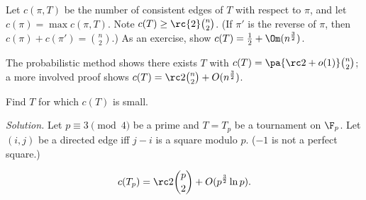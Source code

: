 Let $c(\pi, T)$ be the number of consistent edges of $T$ with respect to $\pi$, and let $c(\pi)=\max c(\pi, T)$. Note $c(T)\ge \rc{2}\binom n2$. (If $\pi'$ is the reverse of $\pi$, then $c(\pi)+c(\pi')=\binom n2$.) As an exercise, show $c(T)=\frac 12+\Om(n^{\frac 32})$.

The probabilistic method shows there exists $T$ with $c(T)=\pa{\rc2+o(1)}\binom n2$; a more involved proof shows $c(T)=\rc 2\binom n2+O(n^{\frac 32})$.

\begin{ex}
Find $T$ for which $c(T)$ is small.
\end{ex}
{\it Solution.} Let $p\equiv 3\pmod 4$ be a prime and $T=T_p$ be a tournament on $\F_p$. Let $(i,j)$ be a directed edge iff $j-i$ is a square modulo $p$. ($-1$ is not a perfect square.) 
\begin{thm}
\[c(T_p)=\rc 2\binom p2+O(p^{\frac 32}\ln p).\]
\end{thm}
